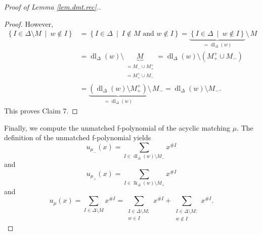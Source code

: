\documentclass[12pt]{amsart}
\theoremstyle{definition}
\DeclareMathOperator{\lk}{lk}
\DeclareMathOperator{\dl}{dl}
\begin{document}
\begin{proof}[Proof of Lemma \ref{lem.dmt.rec}.]
\begin{proof}
However,
\begin{align*}
\left\{  I\in\Delta\setminus M\ \mid\ w\notin I\right\}   &  =\left\{
I\in\Delta\ \mid\ I\notin M\text{ and }w\notin I\right\}
=\underbrace{\left\{  I\in\Delta\ \mid\ w\notin I\right\}  }%
_{=\dl_{\Delta}\left(  w\right)  }\setminus\,M\\
&  =\dl_{\Delta}\left(  w\right)  \setminus
\underbrace{M}_{\substack{=M_-\cup M_+^+\\=M_+^+\cup M_-%
}}=\dl_{\Delta}\left(  w\right)  \setminus\left(
M_+^+\cup M_-\right) \\
&  =\underbrace{\left(  \dl_{\Delta}\left(  w\right)
\setminus M_+^+\right)  }_{=\dl_{\Delta}\left(
w\right)  }\setminus\,M_-=\dl_{\Delta}\left(
w\right)  \setminus M_-.
\end{align*}
This proves Claim 7.
\end{proof}

Finally, we compute the unmatched f-polynomial of the acyclic matching $\mu$.
The definition of the unmatched f-polynomial yields%
\begin{equation}
u_{\mu_-}\left(  x\right)  =\sum_{I\in\dl_{\Delta
}\left(  w\right)  \setminus M_-}x^{\#I} \label{pf.lem.dmt.rec.u-}%
\end{equation}
and%
\begin{equation}
u_{\mu_+}\left(  x\right)  =\sum_{I\in\lk_{\Delta
}\left(  w\right)  \setminus M_+}x^{\#I} \label{pf.lem.dmt.rec.u+}%
\end{equation}
and%
\begin{equation}
u_{\mu}\left(  x\right)  =\sum_{I\in\Delta\setminus M}x^{\#I}=\sum
_{\substack{I\in\Delta\setminus M;\\w\in I}}x^{\#I}+\sum_{\substack{I\in
\Delta\setminus M;\\w\notin I}}x^{\#I}. \label{pf.lem.dmt.rec.u}%
\end{equation}



\end{proof}
\end{document}
